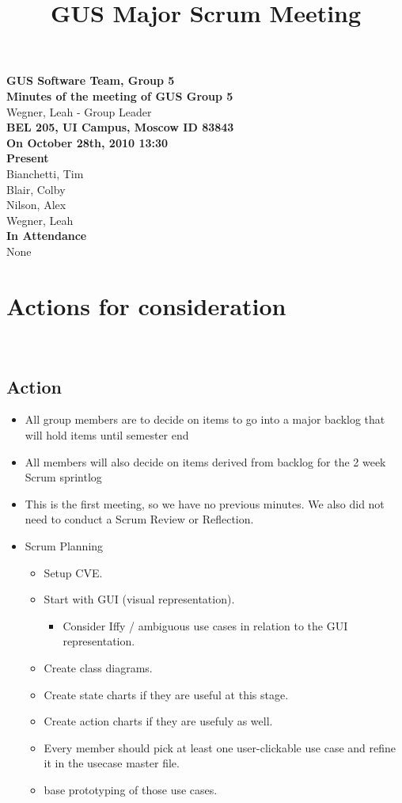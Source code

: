 \documentclass[12pt]{article}
\title{GUS Major Scrum Meeting}
\date{}
\begin{document}
\textbf{GUS Software Team, Group 5} \\
 
\textbf{Minutes of the meeting of GUS Group 5} \\
Wegner, Leah - Group Leader\\
 
\textbf{BEL 205, UI Campus, Moscow ID 83843} \\
 
\textbf{On October 28th, 2010 13:30} \\
 
\textbf{Present}\\
 Bianchetti, Tim\\
 Blair, Colby\\
 Nilson, Alex\\
 Wegner, Leah\\
 
\textbf{In Attendance}\\
None \\
 
\section{Actions for consideration} \\
 
 \subsection{Action}
  \begin{itemize}
   \item All group members are to decide on items to go into a major backlog that will hold items until semester end
   \item All members will also decide on items derived from backlog for the 2 week Scrum sprintlog
   \item This is the first meeting, so we have no previous minutes. We also did not need to conduct a Scrum Review or Reflection.
   \item Scrum Planning
   \begin{itemize}
    \item Setup CVE.
    \item Start with GUI (visual representation).
    \begin{itemize}
     \item Consider Iffy / ambiguous use cases in relation to the GUI representation.
     \end{itemize}
    \item Create class diagrams.
    \item Create state charts if they are useful at this stage.
    \item Create action charts if they are usefuly as well.
    \item Every member should pick at least one user-clickable use case and refine it in the usecase master file.
    \item base prototyping of those use cases.
   \end{itemize}
  \end{itemize}
\end{document}
